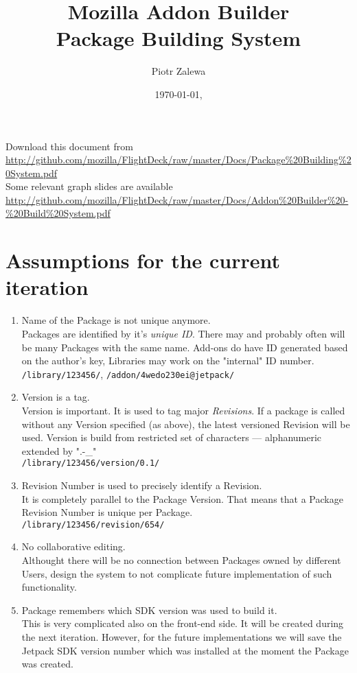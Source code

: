 \documentclass[10pt]{article}
\title{Mozilla Addon Builder\\ Package Building System}
\author{Piotr Zalewa}
\date{\today, \version}
\begin{document}
\maketitle

{\scriptsize
	\noindent Download this document from \\
\url{http://github.com/mozilla/FlightDeck/raw/master/Docs/Package%20Building%20System.pdf}\\
}{\scriptsize
	\noindent Some relevant graph slides are available \\
	\url{http://github.com/mozilla/FlightDeck/raw/master/Docs/Addon%20Builder%20-%20Build%20System.pdf}
}

\section{Assumptions for the current iteration}

	\begin{enumerate}
		\item{Name of the Package is not unique anymore.\\
			Packages are identified by it's {\em unique ID}. There may and probably often will be many
			Packages with the same name. Add-ons do have ID generated based on the author's key, 
			Libraries may work on the "internal" ID number.\\
			{\tt /library/123456/}}, {\tt /addon/4wedo230ei@jetpack/ }
		\item{Version is a tag.\\
			Version is important. It is used to tag major {\em Revisions}. If a package is called without any
			Version specified (as above), the latest versioned Revision will be used. Version is build from 
			restricted set of characters --- alphanumeric extended by ".-\_"\\
			{\tt /library/123456/version/0.1/}}
		\item{Revision Number is used to precisely identify a Revision.\\
			It is completely parallel to the Package Version. That means that a Package Revision Number is 
			unique per Package.\\
			{\tt /library/123456/revision/654/}}
		\item{No collaborative editing.\\
			Althought there will be no connection between Packages owned by different Users, design the 
			system to not complicate future implementation of such functionality.}
		\item{Package remembers which SDK version was used to build it.\\
			This is very complicated also on the front-end side. It will be created during the next
			iteration. However, for the future implementations we will save the Jetpack SDK version number 
			which was installed at the moment the Package was created.}
	\end{enumerate}
\end{document}
